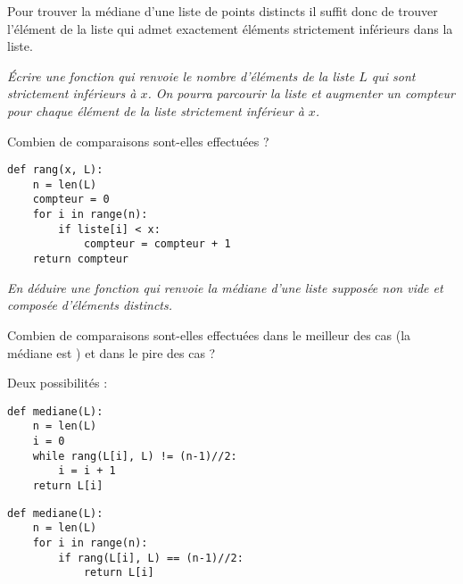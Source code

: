 Pour trouver la médiane d'une liste de points distincts il suffit donc de trouver l'élément de la liste qui admet exactement  éléments strictement inférieurs dans la liste.
\begin{Exercise}\it Écrire une fonction  qui renvoie le nombre d'éléments de la liste $L$ qui sont strictement inférieurs à $x$. On pourra parcourir la liste et augmenter un compteur pour chaque élément de la liste strictement inférieur à $x$.

Combien de comparaisons sont-elles effectuées ?
\end{Exercise}
\begin{Answer} 
\begin{lstlisting}
def rang(x, L):
    n = len(L)
    compteur = 0
    for i in range(n):
        if liste[i] < x:
            compteur = compteur + 1
    return compteur
\end{lstlisting}
\end{Answer}
\begin{Exercise}\it En déduire une fonction  qui renvoie la médiane d'une liste supposée non vide et composée d'éléments distincts.

Combien de comparaisons sont-elles effectuées dans le meilleur des cas (la médiane est ) et dans le pire des cas ?
\end{Exercise} 
\begin{Answer} Deux possibilités :
\begin{lstlisting}
def mediane(L):
    n = len(L)
    i = 0
    while rang(L[i], L) != (n-1)//2:
        i = i + 1
    return L[i]
\end{lstlisting}
\end{Answer}

\begin{Answer} 
\begin{lstlisting}
def mediane(L):
    n = len(L)
    for i in range(n):
        if rang(L[i], L) == (n-1)//2:
            return L[i]
\end{lstlisting}
\newpage
\end{Answer}
\newpage
